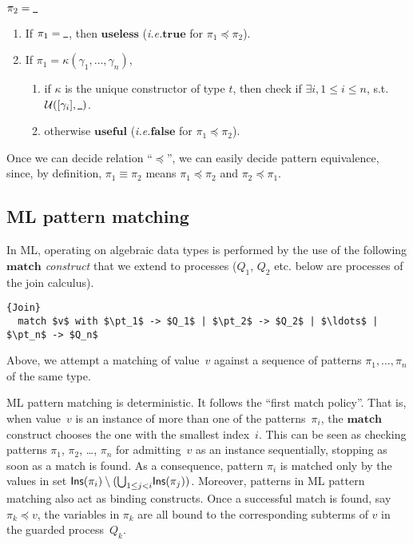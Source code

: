 \documentclass{LMCS}
\makeatletter
\newcommand{\const}{\kappa}
\newcommand{\pt}{\pi}
\newcommand{\lessprecise}{\preceq}
\newcommand{\ins}[1]{{\sf Ins}(#1)}
\newcommand{\ie}{\emph{i.e.}\@\xspace}
\newcommand{\kwd}[1]{\ensuremath{\mathbf{#1}}}
\renewcommand{\_}{\mathord{\rule[-.25ex]{1ex}{.15ex}}}
\makeatother
\begin{document}
 $\pt_2 = \_$  \hfill
  \begin{enumerate}[$\bullet$]
  \item If $\pt_1 = \_$, then $\kwd{useless}$ (\ie $\kwd{true}$ for
    $\pt_1\lessprecise\pt_2$).
  \item If $\pt_1 = \const(\gamma_1,\ldots,\gamma_n)$,
    \begin{enumerate}[$-$]
    \item if $\const$ is the unique constructor of type $t$, then
      check if $\exists i,1\leq i\leq n$, s.t.
      $\mathcal{U}([\gamma_i],\_)$.
    \item otherwise $\kwd{useful}$ (\ie $\kwd{false}$ for
      $\pt_1\lessprecise\pt_2$).
    \end{enumerate}
  \end{enumerate}\medskip


\noindent Once we can decide relation ``$\preceq$'', we can easily
decide pattern equivalence, since, by definition, $\pt_1\equiv\pt_2$
means $\pt_1\lessprecise\pt_2$ and $\pt_2\lessprecise\pt_1$.

\subsection{ML pattern matching}
\label{subsec.MLpt}

In ML, operating on algebraic data types is performed by the use of
the following \emph{\kwd{match} construct}
that we extend to processes ($Q_1$, $Q_2$ etc. below are processes of
the join calculus).
\begin{lstlisting}{Join}
  match $v$ with $\pt_1$ -> $Q_1$ | $\pt_2$ -> $Q_2$ | $\ldots$ | $\pt_n$ -> $Q_n$
\end{lstlisting}
Above, we attempt a matching of value~$v$ against a sequence of patterns
$\pt_1,\ldots,\pt_n$ of the same type. 

ML pattern matching is deterministic. It follows the ``first match
policy''. That is, when value~$v$ is an instance of more than one of
the patterns~$\pt_i$, the \kwd{match} construct chooses the one with
the smallest index~$i$.  This can be seen as checking patterns
$\pt_1$, $\pt_2$, \ldots , $\pt_n$ for admitting~$v$ as an instance
sequentially, stopping as soon as a match is found.  As a consequence,
pattern $\pt_i$ is matched only by the values in set
$\ins{\pt_i}\setminus(\textstyle{\bigcup_{1 \le j < i}}\ins{\pt_j})$.
Moreover, patterns in ML pattern matching also act as binding
constructs.  Once a successful match is found, say $\pt_k\lessprecise v$,
the variables in $\pt_k$ are all bound to the corresponding subterms
of $v$ in the guarded process~$Q_k$.
\end{document}
